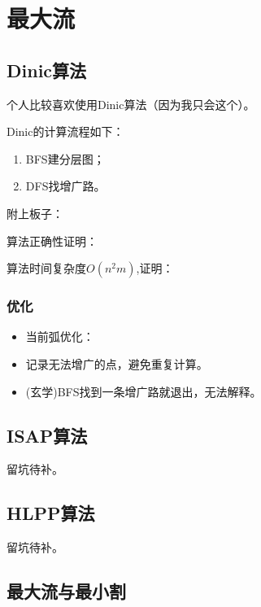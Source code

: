 \section{最大流}
\subsection{Dinic算法}
个人比较喜欢使用Dinic算法（因为我只会这个）。

Dinic的计算流程如下：
\begin{enumerate}
	\item BFS建分层图；
	\item DFS找增广路。
\end{enumerate}

附上板子：


算法正确性证明：

算法时间复杂度$O(n^2m)$,证明：

\subsubsection{优化}
\begin{itemize}
	\item 当前弧优化：
	\item 记录无法增广的点，避免重复计算。
	\item (玄学)BFS找到一条增广路就退出，无法解释。
\end{itemize}

\subsection{ISAP算法}
留坑待补。
\subsection{HLPP算法}
留坑待补。
\subsection{最大流与最小割}
